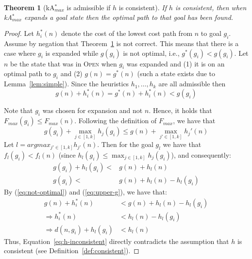 \documentclass{aicom2e}
\newtheorem{theorem}{Theorem}
\newcommand{\kastarmax}{kA$^*_{max}$}
\newcommand{\open}{\textsc{Open}}
\begin{document}
\begin{theorem}[\kastarmax{} is admissible if $h$ is consistent]
    If $h$ is consistent, then when
    \kastarmax{} expands a goal state then the optimal path to that goal has been found.
    \label{the:max-f}
\end{theorem}
\begin{proof}
    Let $h^*_i(n)$ denote the cost of the lowest cost path from $n$ to goal $g_i$.
    Assume by negation that Theorem~\ref{the:max-f} is not correct. This means that
    there is a case where $g_i$ is expanded while $g(g_i)$ is not optimal,
    i.e., $g^*(g_i)<g(g_i)$. Let $n$ be the state 
    that was in \open{}  when $g_i$ was expanded 
    and (1) it is on an optimal path to $g_i$ 
    and (2) $g(n)=g^*(n)$ (such a state exists due to Lemma~\ref{lem:simple}). Since the heuristics $h_1,\ldots, h_k$ are all admissible
    then
    \begin{equation}
    g(n)+h_i^*(n) = g^*(n)+h_i^*(n) < g(g_i)
    \label{eq:not-optimal}
    \end{equation}

    Note that $g_i$ was chosen for expansion and not $n$. Hence, it holds that $ F_{max}(g_i) \leq F_{max}(n) $.
    Following the definition of $F_{max}$, we have that
    \begin{equation}
    g(g_i) + \max_{j\in [1,k]} h_{j}(g_i) \leq g(n)+\max_{j'\in [1,k]} h_j'(n)
    \end{equation}
    Let $l=argmax_{j'\in [1,k]} h_{j'}(n)$.
    Then for the goal $g_l$ we have that
    $f_l(g_i) < f_l(n)$ (since $h_l(g_i) \leq \max_{j\in [1,k]} h_{j}(g_i)$), and consequently:
    \begin{align}
    g(g_i)+h_l(g_i) < & g(n)+h_l(n) \\
    g(g_i) < & g(n)+h_l(n) - h_l(g_i) \label{eq:upper-g}
    \end{align}
    By (\ref{eq:not-optimal}) and (\ref{eq:upper-g}), we have that:    
    \begin{align}
    g(n)+h^*_i(n)  & < g(n)+h_l(n) - h_l(g_i)\\
    \Rightarrow h^*_i(n)  & < h_l(n) - h_l(g_i)\\
    \Rightarrow d(n,g_i) + h_l(g_i) & < h_l(n) \label{eq:h-inconsistent}
    \end{align}
    Thus, Equation~\ref{eq:h-inconsistent} directly contradicts the assumption
    that $h$ is consistent (see Definition~\ref{def:consistent}).
\end{proof}
\end{document}
